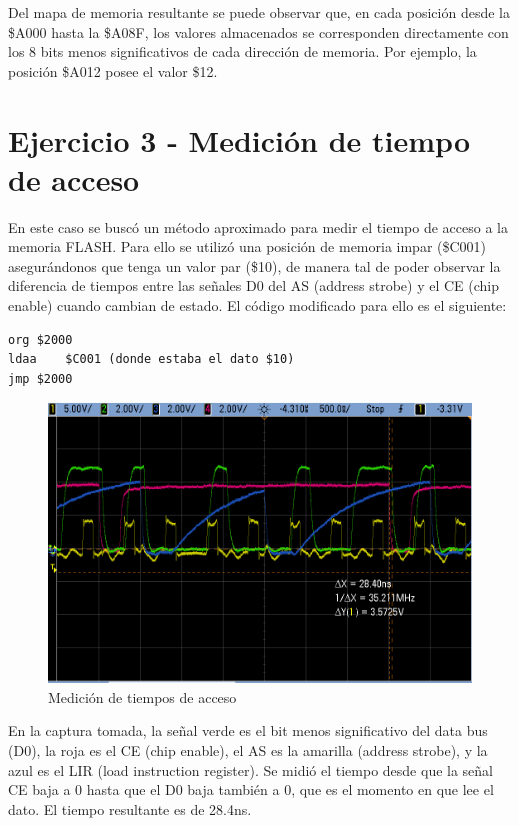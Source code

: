 \documentclass{article}
\begin{document}
Del mapa de memoria resultante se puede observar que, en cada posición desde la \$A000 hasta la \$A08F, los valores almacenados se corresponden directamente con los 8 bits menos significativos de cada dirección de memoria. Por ejemplo, la posición \$A012 posee el valor \$12. 

\newpage

\section*{Ejercicio 3 - Medición de tiempo de acceso}
En este caso se buscó un método aproximado para medir el tiempo de acceso a la memoria FLASH. Para ello se utilizó una posición de memoria impar (\$C001) asegurándonos que tenga un valor par (\$10), de manera tal de poder observar la diferencia de tiempos entre las señales D0 del AS (address strobe) y el CE (chip enable) cuando cambian de estado. El código modificado para ello es el siguiente:

\begin{lstlisting}
org	$2000 
ldaa	$C001 (donde estaba el dato $10) 
jmp	$2000
\end{lstlisting}

\begin{figure}[ht]
	\centering
	\includegraphics[width=0.8 \textwidth]
	{../Ej3/guia1_32.png}
	\caption{Medición de tiempos de acceso}
	\label{fig:ej2}
\end{figure}

En la captura tomada, la señal verde es el bit menos significativo del data bus (D0), la roja es el CE (chip enable), el AS es la amarilla (address strobe), y la azul es el LIR (load instruction register). 
Se midió el tiempo desde que la señal CE baja a 0 hasta que el D0 baja también a 0, que es el momento en que lee el dato. El tiempo resultante es de 28.4ns.
\end{document}
